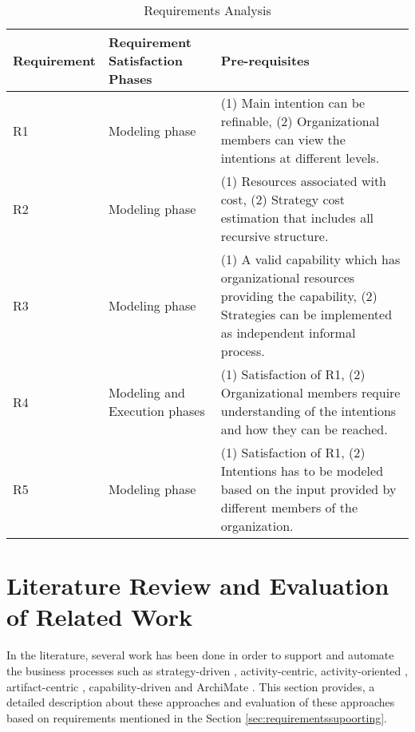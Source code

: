 \begin{table} [htbp]
	\centering
	\begin{tabular} {p{2.5cm}p{3cm}p{8cm}}
		\toprule
		\textbf{Requirement} & \textbf{Requirement Satisfaction Phases} & \textbf{Pre-requisites}    \\
		\midrule                                                                                                               
		R1    & Modeling phase    &(1) Main intention can be refinable, (2) Organizational members can view the intentions at different levels.    \\ 
		
		R2   & Modeling phase    &(1) Resources associated with cost, (2) Strategy cost estimation that includes all recursive structure. \\         
			
		R3   & Modeling phase       &(1) A valid capability which has organizational resources providing the capability, (2) Strategies can be implemented as independent informal process. \\      
		
		R4   & Modeling and Execution phases     &(1) Satisfaction of R1, (2) Organizational members require understanding of the intentions and how they can be reached. \\                         
			
		R5  &Modeling phase  &(1) Satisfaction of R1, (2) Intentions has to be modeled based on the input provided by different members of the organization.               \\ 
		    
		\bottomrule
	\end{tabular}
	\caption{Requirements Analysis}
	\label{tab:subrequirements}
\end{table}

\section{Literature Review and Evaluation of Related Work}
\label{sec:literaturereview}
In the literature, several work has been done in order to support and automate the business processes such as strategy-driven \cite{Bider2005}, activity-centric\cite{Yarosh2009}, activity-oriented \cite{Leymann2000}, artifact-centric \cite{Cohn2009}, capability-driven \cite{Stirna2012} and ArchiMate \cite{Group2012}. This section provides, a detailed description about these approaches and evaluation of these approaches based on requirements mentioned in the Section \ref{sec:requirementssupoorting}. 


